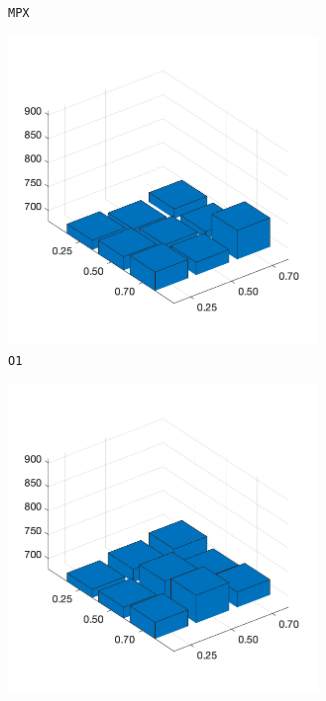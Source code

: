 \begin{figure}[H]
\begin{subfigure}[b]{0.25\textwidth}
		\caption{\texttt{MPX}}
		\label{fig:y}
    	\end{subfigure}
%
	\begin{subfigure}[b]{0.25\textwidth}
		\centering
		\includegraphics[width=0.9\textwidth]{crossover/min/cross_order_1.png}
		\caption{\texttt{O1}}
		\label{fig:z}
    	\end{subfigure}
%
	\begin{subfigure}[b]{0.25\textwidth}
		\centering
		\includegraphics[width=0.9\textwidth]{crossover/min/cross_order_based_1.png}

\end{subfigure}
\end{figure}

